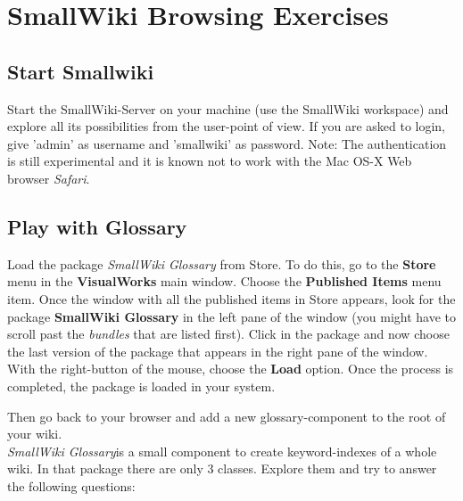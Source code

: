 \ifx\wholebook\relax\else


\fi


\chapter{SmallWiki Browsing Exercises}


\section{Start Smallwiki}
\exercise Start the SmallWiki-Server on your machine (use the SmallWiki workspace) and explore
all its possibilities from the user-point of view. If you are
asked to login, give 'admin' as username and 'smallwiki' as
password. Note: The authentication is still experimental and it is
known not to work with the Mac OS-X Web browser \emph{Safari}.

\section{Play with Glossary}

\exercise Load the package \textit{SmallWiki Glossary} from Store.
To do this, go to the \textbf{Store} menu in the
\textbf{VisualWorks} main window. Choose the \textbf{Published
Items} menu item. Once the window with all the published items in
Store appears, look for the package \textbf{SmallWiki Glossary} in
the left pane of the window (you might have to scroll past the \emph{bundles} that are listed first). Click in the package and now choose
the last version of the package that appears in the right pane of
the window. With the right-button of the mouse, choose the
\textbf{Load} option. Once the process is
completed, the package is loaded in your system.

Then go back to your browser and add a new
glossary-component to the root of your wiki. \\

\textit{SmallWiki Glossary}is a small component to create
keyword-indexes of a whole wiki. In that package there are only 3
classes. Explore them and try to answer the following questions:

